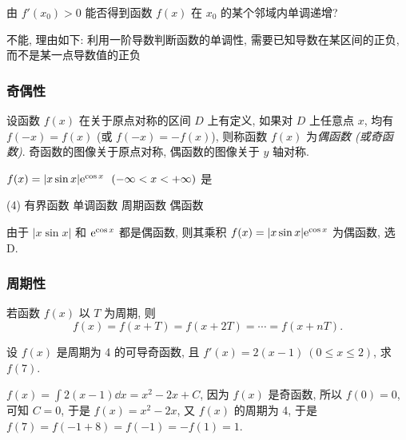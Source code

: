 \begin{example}
    由 $f'(x_0)>0$ 能否得到函数 $f(x)$ 在 $x_0$ 的某个邻域内单调递增?
\end{example}
\begin{solution}
    不能, 理由如下:
    利用一阶导数判断函数的单调性, 需要已知导数在某区间的正负, 而不是某一点导数值的正负
\end{solution}

\subsubsection{奇偶性}

\begin{definition}[函数的奇偶性]
    设函数 $f(x)$ 在关于原点对称的区间 $D$ 上有定义, 如果对 $D$ 上任意点 $x$, 均有 $f(-x)=f(x)$ (或 $f(-x)=-f(x)$), 则称函数 $f(x)$ 为\textit{偶函数 (或奇函数)}.
    奇函数的图像关于原点对称, 偶函数的图像关于 $y$ 轴对称.
\end{definition}

\begin{example}[1987 数二]
    $f(x)=|x\sin x|\mathrm{e}^{\cos x}~~(-\infty<x<+\infty)$ 是
    \begin{tasks}(4)
        \task 有界函数
        \task 单调函数
        \task 周期函数
        \task 偶函数
    \end{tasks}
\end{example}
\begin{solution}
    由于 $|x\sin x|$ 和 $\mathrm{e}^{\cos x}$ 都是偶函数, 则其乘积 $f(x)=|x\sin x|\mathrm{e}^{\cos x}$ 为偶函数, 选 D.
\end{solution}

\subsubsection{周期性}

\begin{theorem}[函数的周期性定理]
    若函数 $f(x)$ 以 $T$ 为周期, 则 $$f(x)=f(x+T)=f(x+2T)=\cdots=f(x+nT).$$
\end{theorem}

\begin{example}[2014 数一]
    设 $f(x)$ 是周期为 4 的可导奇函数, 且 $f'(x)=2(x-1)~ (0\leqslant x\leqslant 2)$, 求 $f(7)$.
\end{example}
\begin{solution}
    $f(x)=\displaystyle\int 2(x-1)\dd x=x^2-2x+C$, 因为 $f(x)$ 是奇函数, 所以 $f(0)=0$, 可知 $C=0$, 于是 $f(x)=x^2-2x$, 
    又 $f(x)$ 的周期为 4, 于是 $f(7)=f(-1+8)=f(-1)=-f(1)=1$.
\end{solution}

